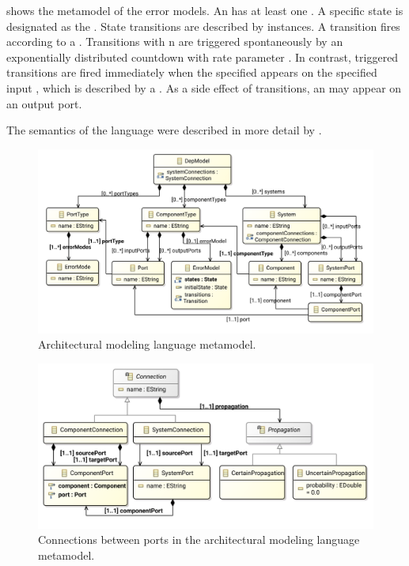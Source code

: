  shows the metamodel of the error models. An  has at least one . A specific state is designated as the . State transitions are described by  instances. A transition fires according to a . Transitions with n  are triggered spontaneously by an exponentially distributed countdown with rate parameter . In contrast,  triggered transitions are fired immediately when the specified  appears on the specified input , which is described by a . As a side effect of transitions, an  may appear on an output port.

The semantics of the language were described in more detail by \citet[Chapter~4]{Ecsedi16architecture}.

\begin{figure}
  \centering
  \includegraphics[scale=0.825]{figures/depmodel_metamodel}
  \caption{Architectural modeling language metamodel.}
  \label{fig:architecture:metamodel}
\end{figure}

\begin{figure}
  \centering
  \includegraphics[scale=0.825]{figures/depmodel_metamodel_connections}
  \caption{Connections between ports in the architectural modeling language metamodel.}
  \label{fig:architecture:connections}
\end{figure}

